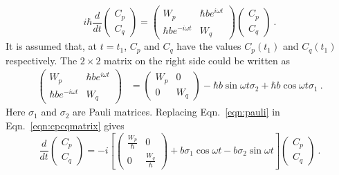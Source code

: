 \begin{equation}
  \label{eqn:cpcqmatrix}
i \hbar \frac{d}{dt}\left(
\begin{array}{cc}
C_p \\
C_q
\end{array} \right) =
\left(
\begin{array}{cc}
W_p & \hbar b e^{i \omega t} \\
\hbar b e^{-i \omega t} & W_q 
\end{array} \right)
\left(
\begin{array}{c}
C_p \\
C_q
\end{array}\right)~.
\end{equation}
It is assumed that, at $t=t_1$, $C_p$ and $C_q$ have the values $C_p(t_1)$
and $C_q(t_1)$ respectively.
The $2 \times 2$ matrix on the right side could be written as
\begin{align}
  \label{eqn:pauli}
\left(
\begin{array}{cc}
W_p & \hbar b e^{i\omega t} \\
\hbar b e^{-i\omega t} & W_q 
\end{array}
\right)
&= \left(
\begin{array}{cc}
W_p & 0 \\
0 & W_q
\end{array} \right) -\hbar b \sin{\omega t} \sigma_2 +\hbar b \cos{\omega t} \sigma_1~.
\end{align}
Here $\sigma_1$ and $\sigma_2$ are Pauli matrices.
Replacing Eqn.~\ref{eqn:pauli} in Eqn.~\ref{eqn:cpcqmatrix} gives
\begin{equation}
\frac{d}{dt} \left( \begin{array}{c}
C_p \\
C_q
\end{array}\right) =
-i \left[
\left(
\begin{array}{cc}
\frac{W_p}{\hbar} & 0 \\
0 & \frac{W_q}{\hbar}
\end{array}\right)
+ b \sigma_1\cos{\omega t}  -b \sigma_2 \sin{\omega t} 
\right]\left( \begin{array}{c}
C_p \\
C_q
\end{array}\right)~.
\end{equation}
